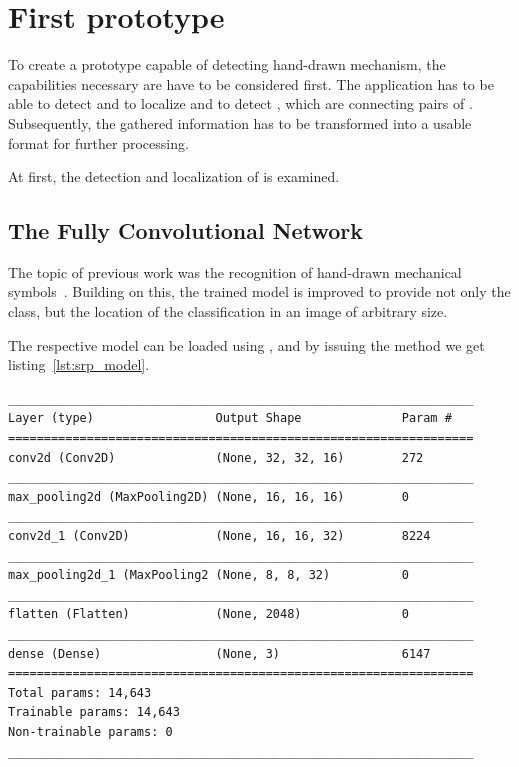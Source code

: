 \section{First prototype} \label{ch:first_prototype}

To create a prototype capable of detecting hand-drawn mechanism, the capabilities necessary are have to be considered first.
The application has to be able to detect and to localize  and to detect , which are connecting pairs of .
Subsequently, the gathered information has to be transformed into a usable format for further processing.

At first, the detection and localization of  is examined.

\subsection{The Fully Convolutional Network}\label{ch:fcn}

The topic of previous work was the recognition of hand-drawn mechanical symbols~\cite{Lawrence2020}.
Building on this, the trained model is improved to provide not only the class, but the location of the classification in an image of arbitrary size.

The respective model can be loaded using , %
 and by issuing the  method we get listing~\ref{lst:srp_model}.

\begin{lstlisting}[caption={Summary of Symbol Classifier.}, label={lst:srp_model}]
_________________________________________________________________
Layer (type)                 Output Shape              Param #
=================================================================
conv2d (Conv2D)              (None, 32, 32, 16)        272
_________________________________________________________________
max_pooling2d (MaxPooling2D) (None, 16, 16, 16)        0
_________________________________________________________________
conv2d_1 (Conv2D)            (None, 16, 16, 32)        8224
_________________________________________________________________
max_pooling2d_1 (MaxPooling2 (None, 8, 8, 32)          0
_________________________________________________________________
flatten (Flatten)            (None, 2048)              0
_________________________________________________________________
dense (Dense)                (None, 3)                 6147
=================================================================
Total params: 14,643
Trainable params: 14,643
Non-trainable params: 0
_________________________________________________________________
\end{lstlisting}

